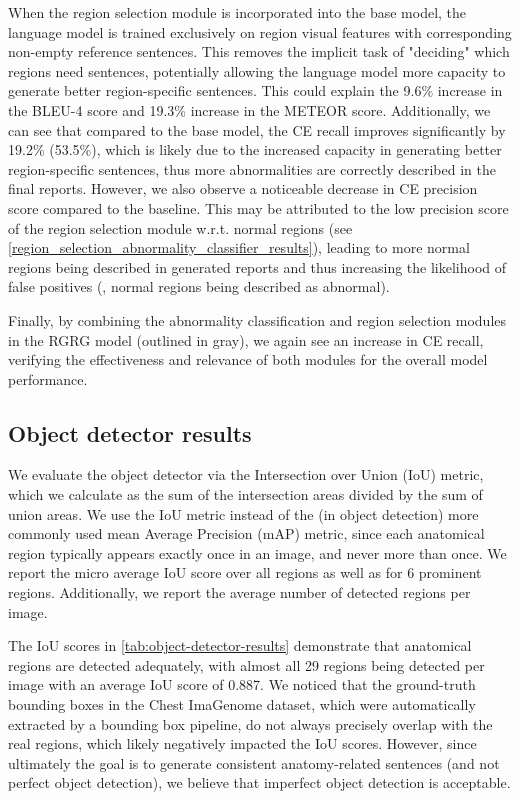 \documentclass[10pt,twocolumn,letterpaper]{article}
\begin{document}
When the region selection module is incorporated into the base model, the language model is trained exclusively on region visual features with corresponding non-empty reference sentences. This removes the implicit task of "deciding" which regions need sentences, potentially allowing the language model more capacity to generate better region-specific sentences. This could explain the 9.6\% increase in the BLEU-4 score and 19.3\% increase in the METEOR score. Additionally, we can see that compared to the base model, the CE recall improves significantly by 19.2\% (53.5\%), which is likely due to the increased capacity in generating better region-specific sentences, thus more abnormalities are correctly described in the final reports. However, we also observe a noticeable decrease in CE precision score compared to the baseline. This may be attributed to the low precision score of the region selection module w.r.t. normal regions (see \cref{region_selection_abnormality_classifier_results}), leading to more normal regions being described in generated reports and thus increasing the likelihood of false positives (\ie, normal regions being described as abnormal).

Finally, by combining the abnormality classification and region selection modules in the RGRG model (outlined in gray), we again see an increase in CE recall, verifying the effectiveness and relevance of both modules for the overall model performance.


\subsection{Object detector results}\label{appendix:od_results}

We evaluate the object detector via the Intersection over Union (IoU) metric, which we calculate as the sum of the intersection areas divided by the sum of union areas. We use the IoU metric instead of the (in object detection) more commonly used mean Average Precision (mAP) metric, since each anatomical region typically appears exactly once in an image, and never more than once. We report the micro average IoU score over all regions as well as for 6 prominent regions. Additionally, we report the average number of detected regions per image.

The IoU scores in \cref{tab:object-detector-results} demonstrate that anatomical regions are detected adequately, with almost all 29 regions being detected per image with an average IoU score of 0.887. We noticed that the ground-truth bounding boxes in the Chest ImaGenome dataset, which were automatically extracted by a bounding box pipeline, do not always precisely overlap with the real regions, which likely negatively impacted the IoU scores. However, since ultimately the goal is to generate consistent anatomy-related sentences (and not perfect object detection), we believe that imperfect object detection is acceptable.
\end{document}
